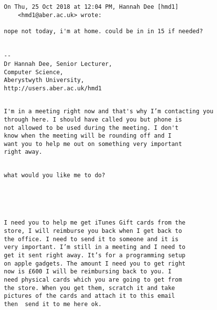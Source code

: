 \documentclass[xcolor=table]{beamer}
\begin{document}
\begin{frame}[fragile]
\begin{small}
	\begin{verbatim}


On Thu, 25 Oct 2018 at 12:04 PM, Hannah Dee [hmd1]
	<hmd1@aber.ac.uk> wrote:

nope not today, i'm at home. could be in in 15 if needed?


-- 
Dr Hannah Dee, Senior Lecturer,
Computer Science,
Aberystwyth University,
http://users.aber.ac.uk/hmd1

	\end{verbatim}
\end{small}
\end{frame}

\begin{frame}[fragile]
\begin{small}
	\begin{verbatim}

I'm in a meeting right now and that's why I’m contacting you
through here. I should have called you but phone is
not allowed to be used during the meeting. I don't
know when the meeting will be rounding off and I
want you to help me out on something very important
right away.

	\end{verbatim}
\end{small}
\end{frame}


\begin{frame}[fragile]
\begin{small}
	\begin{verbatim}

what would you like me to do?


	\end{verbatim}
\end{small}
\end{frame}


 
\begin{frame}[fragile]
\begin{small}
	\begin{verbatim}

I need you to help me get iTunes Gift cards from the
store, I will reimburse you back when I get back to
the office. I need to send it to someone and it is
very important. I’m still in a meeting and I need to
get it sent right away. It’s for a programming setup
on apple gadgets. The amount I need you to get right
now is £600 I will be reimbursing back to you. I
need physical cards which you are going to get from
the store. When you get them, scratch it and take
pictures of the cards and attach it to this email
then  send it to me here ok.

\end{verbatim}
\end{small}
\end{frame}
\end{document}
